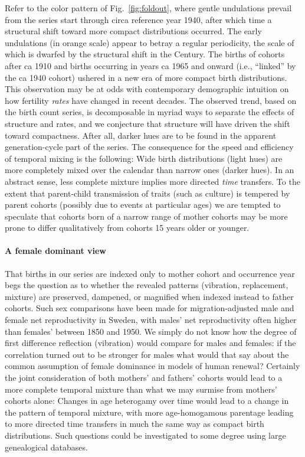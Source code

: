 \documentclass{article}
\begin{document}
Refer to the color pattern of Fig.~\ref{fig:foldout}, where gentle undulations prevail from the series start through circa reference year 1940, after which time a structural shift toward more compact distributions occurred. The early undulations (in orange scale) appear to betray a regular periodicity, the scale of which is dwarfed by the structural shift in the  Century. The births of cohorts after ca 1910 and births occurring in years ca 1965 and onward (i.e., ``linked'' by the ca 1940 cohort) ushered in a new era of more compact birth distributions. This observation may be at odds with contemporary demographic intuition on how fertility \emph{rates} have changed in recent decades. The observed trend, based on the birth count series, is decomposable in myriad ways to separate the effects of structure and rates, and we conjecture that structure will have driven the shift toward compactness. After all, darker hues are to be found in the apparent generation-cycle part of the series. The consequence for the speed and efficiency of temporal mixing is the following: Wide birth distributions (light hues) are more completely mixed over the calendar than narrow ones (darker hues). In an abstract sense, less complete mixture implies more directed \emph{time} transfers. To the extent that parent-child transmission of traits (such as culture) is tempered by parent cohorts (possibly due to events at particular ages) we are tempted to speculate that cohorts born of a narrow range of mother cohorts may be more prone to differ qualitatively from cohorts 15 years older or younger.

\paragraph{A female dominant view}
That births in our series are indexed only to mother cohort and occurrence year begs the question as to whether the revealed patterns (vibration, replacement, mixture) are preserved, dampened, or magnified when indexed instead to father cohorts. Such sex comparisons have been made for migration-adjusted male and female net reproductivity \citep{hyrenius1951reproduction} in Sweden, with males' net reproductivity often higher than females' between 1850 and 1950. We simply do not know how the degree of first difference reflection (vibration) would compare for males and females: if the correlation turned out to be stronger for males what would that say about the common assumption of female dominance in models of human renewal? Certainly the joint consideration of both mothers' and fathers' cohorts would lead to a more complete temporal mixture than what we may surmise from mothers' cohorts alone: Changes in age heterogamy over time would lead to a change in the pattern of temporal mixture, with more age-homogamous parentage leading to more directed time transfers in much the same way as compact birth distributions. Such questions could be investigated to some degree using large genealogical databases.
\end{document}
